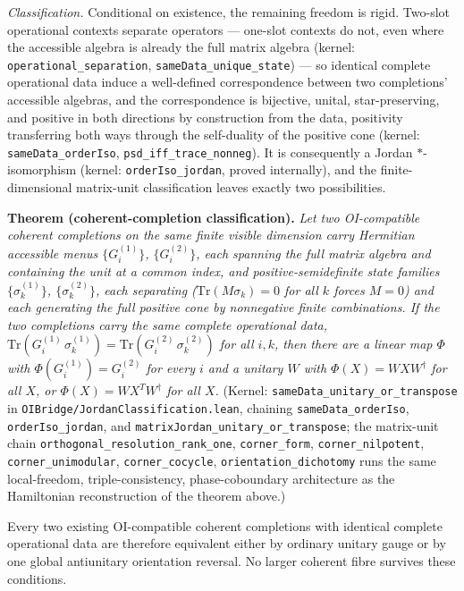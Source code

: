\documentclass[
]{article}
\begin{document}
\emph{Classification.} Conditional on existence, the remaining freedom
is rigid. Two-slot operational contexts separate operators --- one-slot
contexts do not, even where the accessible algebra is already the full
matrix algebra (kernel: \texttt{operational\_separation},
\texttt{sameData\_unique\_state}) --- so identical complete operational
data induce a well-defined correspondence between two completions'
accessible algebras, and the correspondence is bijective, unital,
star-preserving, and positive in both directions by construction from
the data, positivity transferring both ways through the self-duality of
the positive cone (kernel: \texttt{sameData\_orderIso},
\texttt{psd\_iff\_trace\_nonneg}). It is consequently a Jordan
\(*\)-isomorphism (kernel: \texttt{orderIso\_jordan}, proved
internally), and the finite-dimensional matrix-unit classification
leaves exactly two possibilities.

\textbf{Theorem (coherent-completion classification).} \emph{Let two
OI-compatible coherent completions on the same finite visible dimension
carry Hermitian accessible menus \(\{G^{(1)}_i\}\), \(\{G^{(2)}_i\}\),
each spanning the full matrix algebra and containing the unit at a
common index, and positive-semidefinite state families
\(\{\sigma^{(1)}_k\}\), \(\{\sigma^{(2)}_k\}\), each separating
(\(\mathrm{Tr}(M\sigma_k) = 0\) for all \(k\) forces \(M = 0\)) and each
generating the full positive cone by nonnegative finite combinations. If
the two completions carry the same complete operational data,
\(\mathrm{Tr}(G^{(1)}_i\,\sigma^{(1)}_k) = \mathrm{Tr}(G^{(2)}_i\,\sigma^{(2)}_k)\)
for all \(i, k\), then there are a linear map \(\Phi\) with
\(\Phi(G^{(1)}_i) = G^{(2)}_i\) for every \(i\) and a unitary \(W\) with
\(\Phi(X) = W X W^\dagger\) for all \(X\), or
\(\Phi(X) = W X^T W^\dagger\) for all \(X\).} (Kernel:
\texttt{sameData\_unitary\_or\_transpose} in
\texttt{OIBridge/JordanClassification.lean}, chaining
\texttt{sameData\_orderIso}, \texttt{orderIso\_jordan}, and
\texttt{matrixJordan\_unitary\_or\_transpose}; the matrix-unit chain
\texttt{orthogonal\_resolution\_rank\_one}, \texttt{corner\_form},
\texttt{corner\_nilpotent}, \texttt{corner\_unimodular},
\texttt{corner\_cocycle}, \texttt{orientation\_dichotomy} runs the same
local-freedom, triple-consistency, phase-coboundary architecture as the
Hamiltonian reconstruction of the theorem above.)

Every two existing OI-compatible coherent completions with identical
complete operational data are therefore equivalent either by ordinary
unitary gauge or by one global antiunitary orientation reversal. No
larger coherent fibre survives these conditions.
\end{document}
